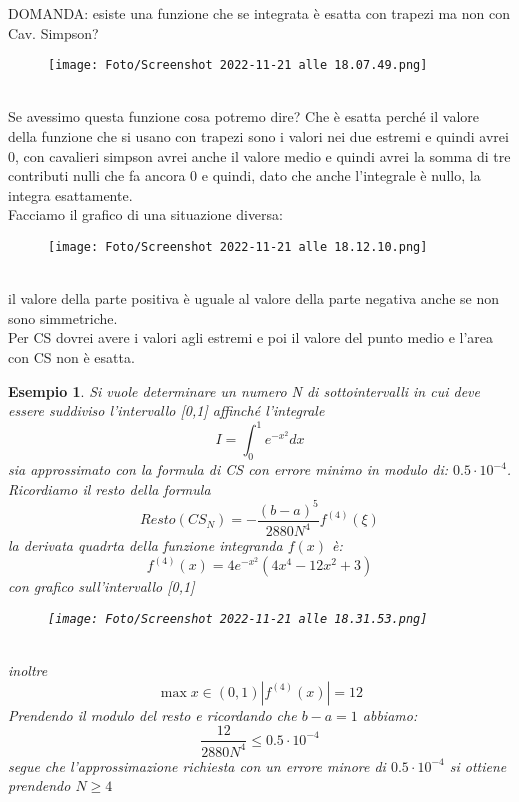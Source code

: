 \documentclass[a4paper, portrait]{book}
\numberwithin{equation}{chapter} %
\newtheorem{example}{Esempio}
\begin{document}
\newpage
DOMANDA: esiste una funzione che se integrata è esatta con trapezi ma non con Cav. Simpson?
\begin{figure}[h!]
    \centering
    \texttt{[image: Foto/Screenshot 2022-11-21 alle 18.07.49.png]}
    \caption{}
\end{figure}
\\Se avessimo questa funzione cosa potremo dire? Che è esatta perché il valore della funzione che si usano con trapezi sono i valori nei due estremi e quindi avrei 0, con cavalieri simpson avrei anche il valore medio e quindi avrei la somma di tre contributi nulli che fa ancora 0 e quindi, dato che anche l'integrale è nullo, la integra esattamente.\\
Facciamo il grafico di una situazione diversa:
\begin{figure}[h!]
    \centering
    \texttt{[image: Foto/Screenshot 2022-11-21 alle 18.12.10.png]}
    \caption{}
\end{figure}
\\il valore della parte positiva è uguale al valore della parte negativa anche se non sono simmetriche.\\
Per CS dovrei avere i valori agli estremi e poi il valore del punto medio e l'area con CS non è esatta.
\begin{example}
    Si vuole determinare un numero N di sottointervalli in cui deve essere suddiviso l'intervallo [0,1] affinché l'integrale
    \begin{equation}
        I = \int_0^1 e^{-x^2}dx
    \end{equation}
    sia approssimato con la formula di CS con errore minimo in modulo di: $0.5 \cdot 10^{-4}$.\\
    Ricordiamo il resto della formula
    \begin{equation}
        Resto(CS_N) = -\frac{(b-a)^5}{2880N^4}f^{(4)}(\xi)
    \end{equation}
    la derivata quadrta della funzione integranda $f(x)$ è:
    \begin{equation}
        f^{(4)}(x) = 4e^{-x^2}(4x^4-12x^2+3)
    \end{equation}
    con grafico sull'intervallo [0,1]
    \begin{figure}[h!]
        \centering
        \texttt{[image: Foto/Screenshot 2022-11-21 alle 18.31.53.png]}
        \caption{}
    \end{figure}
    \\inoltre 
    \begin{equation}
        \max{x\in(0,1)}|f^{(4)}(x)| = 12
    \end{equation}
    Prendendo il modulo del resto e ricordando che $b-a = 1$ abbiamo:
    \begin{equation}
        \frac{12}{2880 N^4} \leq 0.5 \cdot 10^{-4}
    \end{equation}
    segue che l'approssimazione richiesta con un errore minore di $0.5 \cdot 10^{-4}$ si ottiene prendendo $N\geq 4$
\end{example}
\end{document}
